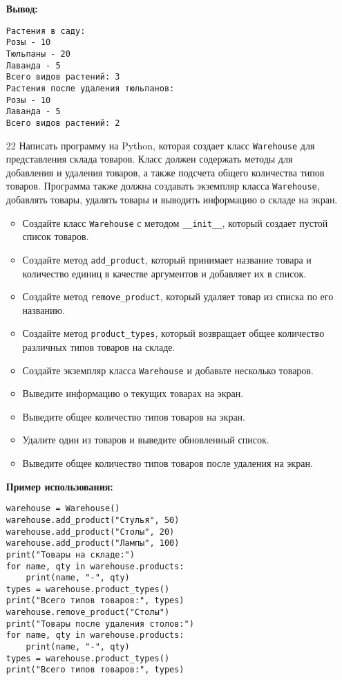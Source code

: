 \begin{enumerate}
\textbf{Вывод:}
\begin{verbatim}
Растения в саду:
Розы - 10
Тюльпаны - 20
Лаванда - 5
Всего видов растений: 3
Растения после удаления тюльпанов:
Розы - 10
Лаванда - 5
Всего видов растений: 2
\end{verbatim}

\item[22] Написать программу на Python, которая создает класс \texttt{Warehouse} для представления склада товаров. Класс должен содержать методы для добавления и удаления товаров, а также подсчета общего количества типов товаров. Программа также должна создавать экземпляр класса \texttt{Warehouse}, добавлять товары, удалять товары и выводить информацию о складе на экран.

\begin{itemize}
    \item Создайте класс \texttt{Warehouse} с методом \texttt{\_\_init\_\_}, который создает пустой список товаров.
    \item Создайте метод \texttt{add\_product}, который принимает название товара и количество единиц в качестве аргументов и добавляет их в список.
    \item Создайте метод \texttt{remove\_product}, который удаляет товар из списка по его названию.
    \item Создайте метод \texttt{product\_types}, который возвращает общее количество различных типов товаров на складе.
    \item Создайте экземпляр класса \texttt{Warehouse} и добавьте несколько товаров.
    \item Выведите информацию о текущих товарах на экран.
    \item Выведите общее количество типов товаров на экран.
    \item Удалите один из товаров и выведите обновленный список.
    \item Выведите общее количество типов товаров после удаления на экран.
\end{itemize}

\textbf{Пример использования:}

\begin{verbatim}
warehouse = Warehouse()
warehouse.add_product("Стулья", 50)
warehouse.add_product("Столы", 20)
warehouse.add_product("Лампы", 100)
print("Товары на складе:")
for name, qty in warehouse.products:
    print(name, "-", qty)
types = warehouse.product_types()
print("Всего типов товаров:", types)
warehouse.remove_product("Столы")
print("Товары после удаления столов:")
for name, qty in warehouse.products:
    print(name, "-", qty)
types = warehouse.product_types()
print("Всего типов товаров:", types)
\end{verbatim}


\end{enumerate}
